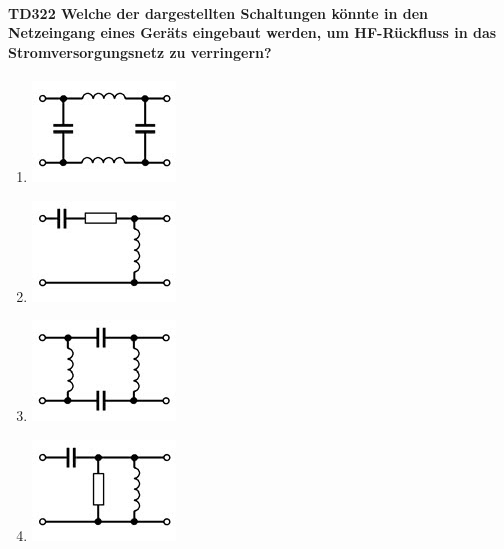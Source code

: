 \documentclass[8pt]{article}
\begin{document}
\begin{enumerate}
\begin{enumerate}[nolistsep,label=\Alph*]
\paragraph*{TD322 Welche der dargestellten Schaltungen könnte in den Netzeingang eines Geräts eingebaut werden, um HF-Rückfluss in das Stromversorgungsnetz zu verringern?}
\begin{enumerate}[nolistsep,label=\Alph*]
\item
\begin{center}
	\begin{minipage}{\linewidth}
		\centering
		\includegraphics[scale=1.0]{pics/td322_a.jpg}
	\end{minipage}
\end{center}
\item
\begin{center}
	\begin{minipage}{\linewidth}
		\centering
		\includegraphics[scale=1.0]{pics/td322_b.jpg}
	\end{minipage}
\end{center}
\item
\begin{center}
	\begin{minipage}{\linewidth}
		\centering
		\includegraphics[scale=1.0]{pics/td322_c.jpg}
	\end{minipage}
\end{center}
\item
\begin{center}
	\begin{minipage}{\linewidth}
		\centering
		\includegraphics[scale=1.0]{pics/td322_d.jpg}
	\end{minipage}
\end{center}
\end{enumerate}


\end{enumerate}
\end{enumerate}
\end{document}

